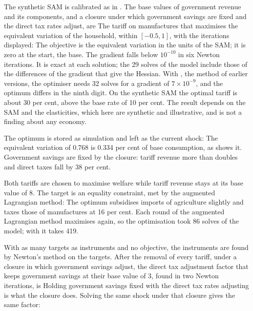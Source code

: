 
The synthetic SAM is calibrated as in . The base values of
government revenue and its components, and a closure under which government
savings are fixed and the direct tax rates adjust, are
The tariff on manufactures that maximises the equivalent variation of the
household, within $[-0.5, 1]$, with the iterations displayed:
The objective is the equivalent variation in the units of the SAM; it is zero
at the start, the base. The gradient falls below $10^{-10}$ in six Newton
iterations. It is exact at each solution; the 29 solves of the model include
those of the differences of the gradient that give the Hessian. With
, the method of earlier versions, the optimiser
needs 32 solves for a gradient of $7 \times 10^{-9}$, and the optimum
differs in the ninth digit. On the synthetic SAM the optimal tariff is about 30 per
cent, above the base rate of 10 per cent. The result depends on the SAM and
the elasticities, which here are synthetic and illustrative, and is not a
finding about any economy.

The optimum is stored as simulation  and left as the current
shock:
The equivalent variation of 0.768 is 0.334 per cent of base consumption, as
 shows it. Government savings are fixed by the closure:
tariff revenue more than doubles and direct taxes fall by 38 per cent.


Both tariffs are chosen to maximise welfare while tariff revenue stays at its
base value of 8. The target is an equality constraint, met by the augmented
Lagrangian method:
The optimum subsidises imports of agriculture slightly and taxes those of
manufactures at 16 per cent. Each round of the augmented Lagrangian method
maximises again, so the optimisation took 86 solves of the model; with
 it takes 419.


With as many targets as instruments and no objective, the instruments are
found by Newton's method on the targets. After the removal of every tariff,
under a closure in which government savings adjust, the direct tax
adjustment factor that keeps government savings at their base value of 3,
found in two Newton iterations, is
Holding government savings fixed with the direct tax rates adjusting is what
the closure  does. Solving the same shock under that closure
gives the same factor:

